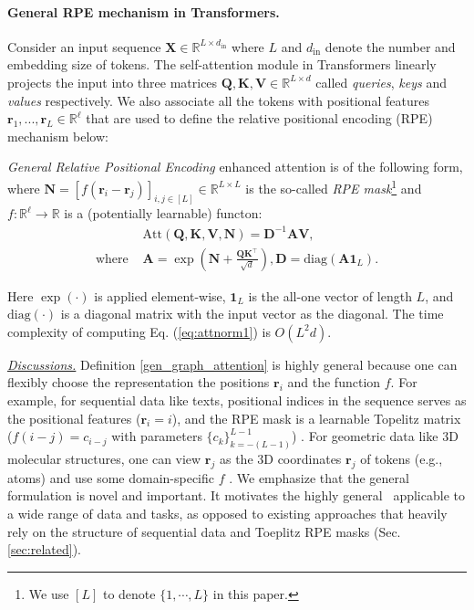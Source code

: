 \paragraph{General RPE mechanism in Transformers.}
Consider an input sequence $\mathbf{X}\in\mathbb{R}^{L\times d_{\text{in}}}$ where $L$ and $d_{\text{in}}$ denote the number and embedding size of tokens. The self-attention module in Transformers linearly projects the input into three matrices $\mathbf{Q}, \mathbf{K}, \mathbf{V} \in \mathbb{R}^{L \times d}$ called \textit{queries}, \textit{keys} and \textit{values} respectively. We also associate all the tokens with positional features $\mathbf{r}_{1},...,\mathbf{r}_{L} \in \mathbb{R}^{\ell}$ that are used to define the relative positional encoding (RPE) mechanism below:

\begin{definition}
\label{gen_graph_attention}
\textit{General Relative Positional Encoding} enhanced attention is of the following form, where $\mathbf{N} = [f(\mathbf{r}_{i}-\mathbf{r}_{j})]_{i,j\in [L]} \in \mathbb{R}^{L \times L}$ is the so-called \textit{RPE mask}\footnote{We use $[L]$ to denote $\{1, \cdots, L\}$ in this paper.} and $f:\mathbb{R}^{\ell} \rightarrow \mathbb{R}$ is a (potentially learnable) functon:
\vspace{-1.5mm}
\begin{align}
    &\mathrm{Att}(\mathbf{Q}, \mathbf{K}, \mathbf{V},\mathbf{N}) = \mathbf{D}^{-1} \mathbf{A} \mathbf{V}, \nonumber \\
    \text{where }& \mathbf{A} = \exp \left(\mathbf{N}  +\frac{\mathbf{Q} \mathbf{K}^\top} {\sqrt{d}}\right), \mathbf{D} = \mathrm{diag} ( \mathbf{A} \mathbf{1}_L ).  \label{eq:attnorm1}
\end{align}
\end{definition}
\vspace{-1.5mm}

Here $\exp (\cdot)$ is applied element-wise, $\mathbf{1}_L$ is the all-one vector of length $L$, and $\mathrm{diag} (\cdot)$ is a diagonal matrix with the input vector as the diagonal. The time complexity of computing Eq. (\ref{eq:attnorm1}) is $O(L^2 d)$.

\underline{\textit{Discussions.}} Definition \ref{gen_graph_attention} is highly general because one can flexibly choose the representation the positions $\mathbf{r}_i$ and the function $f$. For example, for sequential data like texts, positional indices in the sequence serves as the positional features ($\mathbf{r}_i=i$), and the RPE mask is a learnable Topelitz matrix ($f(i-j)=c_{i-j}$ with parameters $\{c_{k}\}_{k=-(L-1)}^{L-1}$) \cite{raffel}. For geometric data like 3D molecular structures, one can view $\mathbf{r}_{j}$ as the 3D coordinates $\mathbf{r}_{j}$ of tokens (e.g., atoms) and use some domain-specific $f$ \cite{shi2022benchmarking}. We emphasize that the general formulation is novel and important. It motivates the highly general \FLTs~applicable to a wide range of data and tasks, as opposed to existing approaches that heavily rely on the structure of sequential data and Toeplitz RPE masks (Sec. \ref{sec:related}). 

